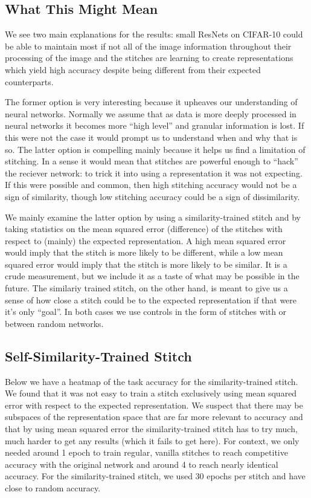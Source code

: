 \documentclass{article} %
\begin{document}
\subsection*{What This Might Mean}
We see two main explanations for the results: small ResNets on CIFAR-10 could be able to maintain most if not all of the image
information throughout their processing of the image and the stitches are learning to create representations which yield high
accuracy despite being different from their expected counterparts.

The former option is very interesting because it upheaves our understanding of neural networks. Normally we assume that
as data is more deeply processed in neural networks it becomes more ``high level'' and granular information is lost. If
this were not the case it would prompt us to understand when and why that is so. The latter option is compelling mainly
because it helps us find a limitation of stitching. In a sense it would mean that stitches are powerful enough to ``hack''
the reciever network: to trick it into using a representation it was not expecting. If this were possible and common, then
high stitching accuracy would not be a sign of similarity, though low stitching accuracy could be a sign of dissimilarity.

We mainly examine the latter option by using a similarity-trained stitch and by taking statistics on the mean squared
error (difference) of the stitches with respect to (mainly) the expected representation. A high mean squared error would
imply that the stitch is more likely to be different, while a low mean squared error would imply that the stitch is more
likely to be similar. It is a crude measurement, but we include it as a taste of what may be possible in the future. The
similariy trained stitch, on the other hand, is meant to give us a sense of how close a stitch could be to the expected
representation if that were it's only ``goal''. In both cases we use controls in the form of stitches with or between
random networks.

\subsection*{Self-Similarity-Trained Stitch}
Below we have a heatmap of the task accuracy for the similarity-trained stitch. We found that it was not
easy to train a stitch exclusively using mean squared error with respect to the expected representation. We suspect
that there may be subspaces of the representation space that are far more relevant to accuracy and that by using
mean squared error the similarity-trained stitch has to try much, much harder to get any results (which it fails
to get here). For context, we only needed around 1 epoch to train regular, vanilla stitches to reach competitive accuracy
with the original network and around 4 to reach nearly identical accuracy. For the similarity-trained stitch, we used 30
epochs per stitch and have close to random accuracy.
\end{document}
